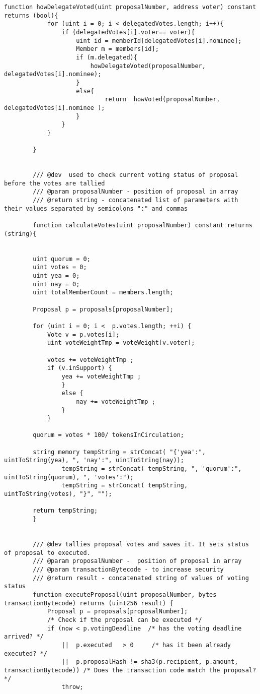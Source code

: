 \documentclass{article}
\begin{document}
\begin{lstlisting}[style=MyCStyle]
        function howDelegateVoted(uint proposalNumber, address voter) constant returns (bool){
            for (uint i = 0; i < delegatedVotes.length; i++){
                if (delegatedVotes[i].voter== voter){
                    uint id = memberId[delegatedVotes[i].nominee];
                    Member m = members[id];
                    if (m.delegated){
                        howDelegateVoted(proposalNumber, delegatedVotes[i].nominee);
                    }
                    else{
                            return  howVoted(proposalNumber, delegatedVotes[i].nominee );
                    }
                }
            }

        }


        /// @dev  used to check current voting status of proposal before the votes are tallied
        /// @param proposalNumber - position of proposal in array
        /// @return string - concatenated list of parameters with their values separated by semicolons ":" and commas

        function calculateVotes(uint proposalNumber) constant returns (string){


        uint quorum = 0;
        uint votes = 0;
        uint yea = 0;
        uint nay = 0;
        uint totalMemberCount = members.length;

        Proposal p = proposals[proposalNumber];

        for (uint i = 0; i <  p.votes.length; ++i) {
            Vote v = p.votes[i];
            uint voteWeightTmp = voteWeight[v.voter];

            votes += voteWeightTmp ;
            if (v.inSupport) {
                yea += voteWeightTmp ;
                }
                else {
                    nay += voteWeightTmp ;
                }
            }

        quorum = votes * 100/ tokensInCirculation;

        string memory tempString = strConcat( "{'yea':", uintToString(yea), ", 'nay':", uintToString(nay));
                tempString = strConcat( tempString, ", 'quorum':", uintToString(quorum), ", 'votes':");
                tempString = strConcat( tempString, uintToString(votes), "}", "");

        return tempString;
        }


        /// @dev tallies proposal votes and saves it. It sets status of proposal to executed.
        /// @param proposalNumber -  position of proposal in array
        /// @param transactionBytecode - to increase security
        /// @return result - concatenated string of values of voting status
        function executeProposal(uint proposalNumber, bytes transactionBytecode) returns (uint256 result) {
            Proposal p = proposals[proposalNumber];
            /* Check if the proposal can be executed */
            if (now < p.votingDeadline  /* has the voting deadline arrived? */
                ||  p.executed   > 0     /* has it been already executed? */
                ||  p.proposalHash != sha3(p.recipient, p.amount, transactionBytecode)) /* Does the transaction code match the proposal? */
                throw;


\end{lstlisting}
\end{document}
